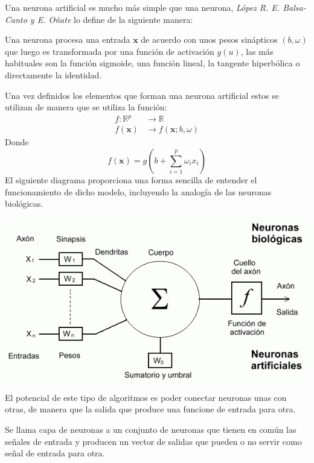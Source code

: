\noindent Una neurona artificial es mucho más simple que una neurona, \emph{López R. E. Balsa-Canto y E. Oñate} \cite{Roberto 2008} lo define de la siguiente manera: 
\begin{defi}
Una neurona procesa una entrada $\textbf{x}$ de acuerdo con unos pesos sinápticos $(b,\omega)$ que luego es transformada por una función de activación $g(u)$, las más habituales son la función sigmoide, una función lineal, la tangente hiperbólica o directamente la identidad. 

\noindent Una  vez definidos los elementos que forman una neurona artificial estos se utilizan de manera que se utiliza la función:
\begin{equation}
\begin{split}
f:\mathbb{R}^p &\longrightarrow \mathbb{R}\\
f(\textbf{x})&\longrightarrow f(\textbf{x};b,\omega)
\end{split}
\end{equation}
Donde 
\begin{equation}
f(\textbf{x})=g\left(b+\sum_{i=1}^p \omega_i x_i\right)
\end{equation}
El siguiente diagrama proporciona una forma sencilla de entender el funcionamiento de dicho modelo, incluyendo la analogía de las neuronas biológicas. 
\end{defi}
\begin{center}
\includegraphics[scale=0.6]{Documentos Extra/Imagenes/neurona.png}
\end{center}

\noindent El potencial de este tipo de algoritmos es poder conectar neuronas unas con otras, de manera que la salida que produce una funcione de entrada para otra.
\begin{defi}
Se llama capa de neuronas a un conjunto de neuronas que tienen en común las señales de entrada y producen un vector de salidas que pueden o no servir como señal de entrada para otra. 
\end{defi}

